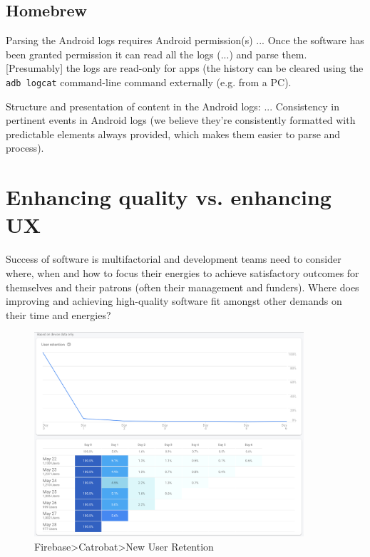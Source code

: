 \subsection{Homebrew}
Parsing the Android logs requires Android permission(s) ... Once the software has been granted permission it can read all the logs (...) and parse them. [Presumably] the logs are read-only for apps (the history can be cleared using the \texttt{adb logcat} command-line command externally (e.g. from a PC).

Structure and presentation of content in the Android logs: ...
Consistency in pertinent events in Android logs (we believe they're consistently formatted with predictable elements always provided, which makes them easier to parse and process).



\section{Enhancing quality vs. enhancing UX}\label{enhancing-quality-vs-enhancing-ux}
Success of software is multifactorial and development teams need to consider where, when and how to focus their energies to achieve satisfactory outcomes for themselves and their patrons (often their management and funders). Where does improving and achieving high-quality software fit amongst other demands on their time and energies?

\begin{figure}[ht]
    \centering
    \includegraphics[width=10cm]{images/firebase/Firebase-pocketcode-android-7-day-new-user-retention-29-may-2020.png}
    \caption{Firebase>Catrobat>New User Retention}
    \label{fig:Firebase-pocketcode-android-7-day-new-user-retention-29-may-2020}
\end{figure}

